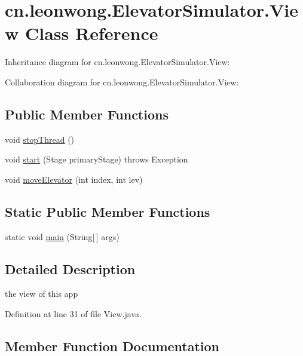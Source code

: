 \hypertarget{classcn_1_1leonwong_1_1_elevator_simulator_1_1_view}{}\section{cn.\+leonwong.\+Elevator\+Simulator.\+View Class Reference}
\label{classcn_1_1leonwong_1_1_elevator_simulator_1_1_view}


Inheritance diagram for cn.\+leonwong.\+Elevator\+Simulator.\+View\+:


Collaboration diagram for cn.\+leonwong.\+Elevator\+Simulator.\+View\+:
\subsection*{Public Member Functions}
\begin{DoxyCompactItemize}
\item 
void \hyperlink{classcn_1_1leonwong_1_1_elevator_simulator_1_1_view_a0cea78020cab972bf8370aff8bed9eea}{stop\+Thread} ()
\item 
void \hyperlink{classcn_1_1leonwong_1_1_elevator_simulator_1_1_view_a068904406a0d25168fedd721dee528ac}{start} (Stage primary\+Stage)  throws Exception
\item 
void \hyperlink{classcn_1_1leonwong_1_1_elevator_simulator_1_1_view_af6d3d9a99e60ae5cdcb26d16fe8f19b5}{move\+Elevator} (int index, int lev)
\end{DoxyCompactItemize}
\subsection*{Static Public Member Functions}
\begin{DoxyCompactItemize}
\item 
static void \hyperlink{classcn_1_1leonwong_1_1_elevator_simulator_1_1_view_a9b10d053813ba170b468ad402774bed9}{main} (String\mbox{[}$\,$\mbox{]} args)
\end{DoxyCompactItemize}


\subsection{Detailed Description}
the view of this app 

Definition at line 31 of file View.\+java.



\subsection{Member Function Documentation}
\mbox{\label{classcn_1_1leonwong_1_1_elevator_simulator_1_1_view_a9b10d053813ba170b468ad402774bed9}} 
